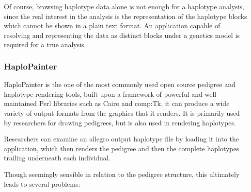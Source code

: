 Of course, browsing haplotype data alone is not enough for a haplotype analysis, since the real interest in the analysis is the representation of the haplotype blocks which cannot be shown in a plain text format. An application capable of resolving and representing the data as distinct blocks under a genetics model is required for a true analysis.


\subsubsection{HaploPainter}

HaploPainter is the one of the most commonly used open source pedigree and haplotype rendering tools, built upon a framework of powerful and well-maintained Perl libraries such as Cairo and \gls{comp:Tk}, it can produce a wide variety of output formats from the graphics that it renders. 
It is primarily used by researchers for drawing pedigrees, but is also used in rendering haplotypes.

Researchers can examine an allegro output haplotype file by loading it into the application, which then renders the pedigree and then the complete haplotypes trailing underneath each individual.

Though seemingly sensible in relation to the pedigree structure, this ultimately leads to several problems:


